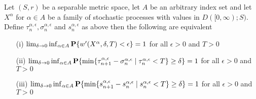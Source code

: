 \begin{lem}\label{SkorohodInfiniteModulusOfContinuityEquivalences}Let $(S,r)$ be a separable metric space, let $A$ be an arbitrary index set and let $X^\alpha$ for $\alpha \in A$ be a family of stochastic processes with values in $D([0,\infty); S)$.  Define $\tau^{\alpha, \epsilon}_n, \sigma^{\alpha, \epsilon}_n$ and $s^{\alpha, \epsilon}_n$ as above then the following are equivalent
\begin{itemize}
\item[(i)]$\lim_{\delta \to 0} \inf_{\alpha \in A} \textbf{P}\{w^{\prime}(X^\alpha, \delta, T) < \epsilon\} = 1$ for all $\epsilon > 0$ and $T > 0$
\item[(ii)]$\lim_{\delta \to 0} \inf_{\alpha \in A} \textbf{P}\{\min \lbrace \tau^{\alpha, \epsilon}_{n+1} - \sigma^{\alpha, \epsilon}_n \mid \tau^{\alpha, \epsilon}_n < T \rbrace \geq \delta\} = 1$ for all 
$\epsilon > 0$ and $T > 0$
\item[(iii)]$\lim_{\delta \to 0} \inf_{\alpha \in A} \textbf{P}\{\min \lbrace s^{\alpha, \epsilon}_{n+1} - s^{\alpha, \epsilon}_n \mid s^{\alpha, \epsilon}_n < T \rbrace \geq \delta\} = 1$ for all 
$\epsilon > 0$ and $T > 0$
\end{itemize}
\end{lem}
